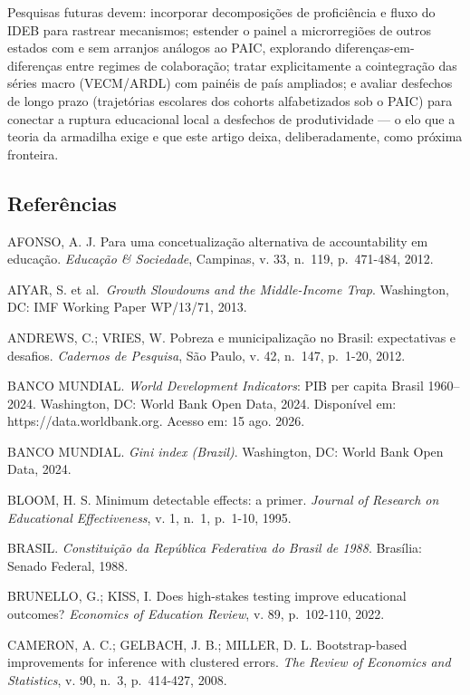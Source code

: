 \documentclass[
  brazilian,
  12pt,
  a4paper,
]{article}
\begin{document}
Pesquisas futuras devem: incorporar decomposições de proficiência e
fluxo do IDEB para rastrear mecanismos; estender o painel a
microrregiões de outros estados com e sem arranjos análogos ao PAIC,
explorando diferenças-em-diferenças entre regimes de colaboração; tratar
explicitamente a cointegração das séries macro (VECM/ARDL) com painéis
de país ampliados; e avaliar desfechos de longo prazo (trajetórias
escolares dos cohorts alfabetizados sob o PAIC) para conectar a ruptura
educacional local a desfechos de produtividade --- o elo que a teoria da
armadilha exige e que este artigo deixa, deliberadamente, como próxima
fronteira.

\subsection{Referências}\label{referuxeancias}

\begingroup\small

AFONSO, A. J. Para uma concetualização alternativa de accountability em
educação. \emph{Educação \& Sociedade}, Campinas, v. 33, n.~119,
p.~471-484, 2012.

AIYAR, S. et al.~\emph{Growth Slowdowns and the Middle-Income Trap}.
Washington, DC: IMF Working Paper WP/13/71, 2013.

ANDREWS, C.; VRIES, W. Pobreza e municipalização no Brasil: expectativas
e desafios. \emph{Cadernos de Pesquisa}, São Paulo, v. 42, n.~147,
p.~1-20, 2012.

BANCO MUNDIAL. \emph{World Development Indicators}: PIB per capita
Brasil 1960--2024. Washington, DC: World Bank Open Data, 2024.
Disponível em: https://data.worldbank.org. Acesso em: 15 ago. 2026.

BANCO MUNDIAL. \emph{Gini index (Brazil)}. Washington, DC: World Bank
Open Data, 2024.

BLOOM, H. S. Minimum detectable effects: a primer. \emph{Journal of
Research on Educational Effectiveness}, v. 1, n.~1, p.~1-10, 1995.

BRASIL. \emph{Constituição da República Federativa do Brasil de 1988}.
Brasília: Senado Federal, 1988.

BRUNELLO, G.; KISS, I. Does high-stakes testing improve educational
outcomes? \emph{Economics of Education Review}, v. 89, p.~102-110, 2022.

CAMERON, A. C.; GELBACH, J. B.; MILLER, D. L. Bootstrap-based
improvements for inference with clustered errors. \emph{The Review of
Economics and Statistics}, v. 90, n.~3, p.~414-427, 2008.
\end{document}
